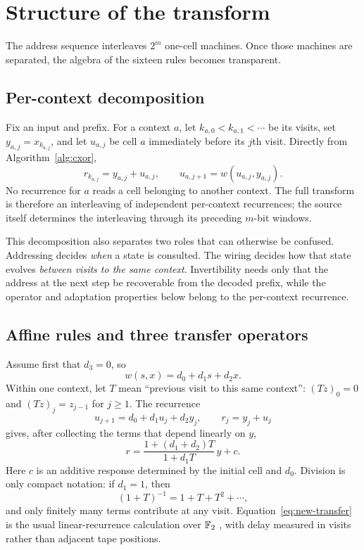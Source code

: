 \section{Structure of the transform}\label{sec:structure}

The address sequence interleaves $2^m$ one-cell machines.  Once those machines are separated, the
algebra of the sixteen rules becomes transparent.

\subsection{Per-context decomposition}

Fix an input and prefix.  For a context $a$, let $k_{a,0}<k_{a,1}<\cdots$ be its visits, set
$y_{a,j}=x_{k_{a,j}}$, and let $u_{a,j}$ be cell $a$ immediately before its $j$th visit.  Directly
from Algorithm~\ref{alg:cxor},
\begin{equation}\label{eq:per-context-general}
  r_{k_{a,j}}=y_{a,j}+u_{a,j},
  \qquad
  u_{a,j+1}=w(u_{a,j},y_{a,j}).
\end{equation}
No recurrence for $a$ reads a cell belonging to another context.  The full transform is therefore
an interleaving of independent per-context recurrences; the source itself determines the
interleaving through its preceding $m$-bit windows.

This decomposition also separates two roles that can otherwise be confused.  Addressing decides
\emph{when} a state is consulted.  The wiring decides how that state evolves \emph{between visits
to the same context}.  Invertibility needs only that the address at the next step be recoverable
from the decoded prefix, while the operator and adaptation properties below belong to the
per-context recurrence.

\subsection{Affine rules and three transfer operators}

Assume first that $d_3=0$, so
\[
  w(s,x)=d_0+d_1s+d_2x.
\]
Within one context, let $T$ mean ``previous visit to this same context'': $(Tz)_0=0$ and
$(Tz)_j=z_{j-1}$ for $j\ge1$.  The recurrence
\[
  u_{j+1}=d_0+d_1u_j+d_2y_j,
  \qquad r_j=y_j+u_j
\]
gives, after collecting the terms that depend linearly on $y$,
\begin{equation}\label{eq:new-transfer}
  r
  =
  \frac{1+(d_1+d_2)T}{1+d_1T}\,y+c .
\end{equation}
Here $c$ is an additive response determined by the initial cell and $d_0$.  Division is only
compact notation: if $d_1=1$, then
\[
  (1+T)^{-1}=1+T+T^2+\cdots,
\]
and only finitely many terms contribute at any visit.  Equation~\eqref{eq:new-transfer} is the
usual linear-recurrence calculation over $\mathbb{F}_2$ \cite{golomb1967,lincostello2004}, with delay
measured in visits rather than adjacent tape positions.

